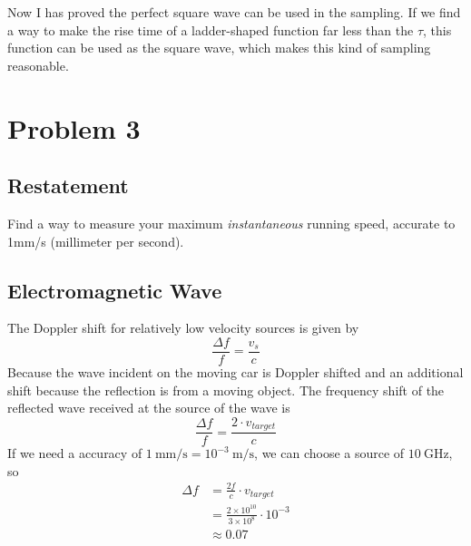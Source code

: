 \documentclass{article}
\begin{document}
Now I has proved the perfect square wave can be used in the sampling. If we find a way to make the rise time of a ladder-shaped function far less than the $\tau$, this function can be used as the square wave, which makes this kind of sampling reasonable.


\section{Problem 3}

\subsection{Restatement}
Find a way to measure your maximum \emph{instantaneous} running speed, accurate to 1mm/s (millimeter per second).




\subsection{Electromagnetic Wave}
The Doppler shift for relatively low velocity sources is given by
\begin{equation}
    \frac{\Delta f}{f} = \frac{v_s}{c}
\end{equation}
Because the wave incident on the moving car is Doppler shifted and an additional shift because the reflection is from a moving object. The frequency shift of the reflected wave received at the source of the wave is
\begin{equation}
    \frac{\Delta f}{f} = \frac{2 \cdot v_{target}}{c}
\end{equation}
If we need a accuracy of $1~\mathrm{mm/s} = 10^{-3}~\mathrm{m/s}$, we can choose a source of $10~\mathrm{GHz}$, so
\begin{equation}
    \begin{aligned}
        \Delta f &= \frac{2f}{c} \cdot v_{target} \\
        &= \frac{2 \times 10^{10}}{3\times10^{8}} \cdot 10^{-3}\\
        &\approx 0.07
    \end{aligned}
\end{equation}
\end{document}

